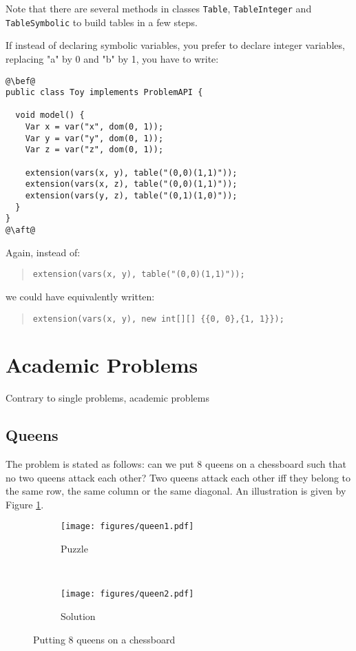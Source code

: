 \documentclass[10pt]{article}
\newcommand{\nn}[1]{{\tt #1}} %
\begin{document}
Note that there are several methods in classes \nn{Table}, \nn{TableInteger} and \nn{TableSymbolic} to build tables in a few steps.

If instead of declaring symbolic variables, you prefer to declare integer variables, replacing "a" by 0 and "b" by 1, you have to write:


\begin{lstlisting}
@\bef@
public class Toy implements ProblemAPI {
  
  void model() {
    Var x = var("x", dom(0, 1));
    Var y = var("y", dom(0, 1));
    Var z = var("z", dom(0, 1));
    
    extension(vars(x, y), table("(0,0)(1,1)"));
    extension(vars(x, z), table("(0,0)(1,1)"));
    extension(vars(y, z), table("(0,1)(1,0)"));
  }
}
@\aft@
\end{lstlisting}


Again, instead of:
\begin{quote}
  \verb!extension(vars(x, y), table("(0,0)(1,1)"));!
\end{quote}
we could have equivalently written:
\begin{quote}
  \verb!extension(vars(x, y), new int[][] {{0, 0},{1, 1}});!
\end{quote}


\section{Academic Problems}

Contrary to single problems, academic problems 


\subsection{Queens}

The problem is stated as follows: can we put 8 queens on a chessboard such that no two queens attack each other?
Two queens attack each other iff they belong to the same row, the same column or the same diagonal.
An illustration is given by Figure \ref{fig:queens}.

\begin{figure}[h]
  \centering
    \begin{subfigure}[t]{0.5\textwidth}
        \centering
        \texttt{[image: figures/queen1.pdf]}
        \caption{Puzzle}
    \end{subfigure}%
    ~ 
    \begin{subfigure}[t]{0.5\textwidth}
        \centering
        \texttt{[image: figures/queen2.pdf]}
        \caption{Solution}
    \end{subfigure}
    \caption{Putting 8 queens on a chessboard \label{fig:queens}}
\end{figure}
\end{document}
